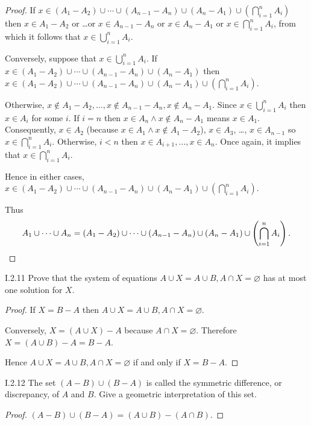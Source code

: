 \begin{proof}
	If \( x \in (A_{1} - A_{2}) \cup \cdots \cup (A_{n-1} - A_{n}) \cup (A_{n} - A_{1}) \cup \left( \bigcap^{n}_{i=1}A_{i} \right) \) then \( x \in A_{1} - A_{2} \) or \ldots or \( x \in A_{n-1} - A_{n} \) or \( x \in A_{n} - A_{1} \) or \( x \in \bigcap^{n}_{i=1}A_{i} \), from which it follows that \( x \in \bigcup^{n}_{i=1} A_{i} \).

	Conversely, suppose that \( x \in \bigcup^{n}_{i=1}A_{i} \). If \( x \in (A_{1} - A_{2}) \cup \cdots \cup (A_{n-1} - A_{n}) \cup (A_{n} - A_{1}) \) then \( x \in (A_{1} - A_{2}) \cup \cdots \cup (A_{n-1} - A_{n}) \cup (A_{n} - A_{1}) \cup \left( \bigcap^{n}_{i=1}A_{i} \right) \).

	Otherwise, \( x \notin A_{1} - A_{2}, \ldots, x\notin A_{n-1} - A_{n}, x \notin A_{n} - A_{1} \). Since \( x \in \bigcup^{n}_{i=1}A_{i} \) then \( x \in A_{i} \) for some \( i \). If \( i = n \) then \( x \in A_{n} \land x \notin A_{n} - A_{1} \) means \( x \in A_{1} \). Consequently, \( x \in A_{2} \) (because \( x \in A_{1} \land x \notin A_{1} - A_{2} \)), \( x \in A_{3} \), \ldots, \( x \in A_{n-1} \) so \( x \in \bigcap^{n}_{i=1}A_{i} \). Otherwise, \( i < n \) then \( x\in A_{i+1}, \ldots, x\in A_{n} \). Once again, it implies that \( x \in \bigcap^{n}_{i=1} A_{i} \).

	Hence in either cases, \( x \in (A_{1} - A_{2}) \cup \cdots \cup (A_{n-1} - A_{n}) \cup (A_{n} - A_{1}) \cup \left( \bigcap^{n}_{i=1}A_{i} \right) \).

	Thus
	\[
		A_{1} \cup \cdots \cup A_{n} = (A_{1} - A_{2}) \cup \cdots \cup (A_{n-1} - A_{n}) \cup (A_{n} - A_{1}) \cup \left( \bigcap^{n}_{i=1}A_{i} \right).\qedhere
	\]
\end{proof}

\begin{problem}{I.2.11}
Prove that the system of equations \( A\cup X = A\cup B, A \cap X = \varnothing \) has at most one solution for \(X\).
\end{problem}

\begin{proof}
	If \( X = B - A \) then \( A\cup X = A\cup B, A \cap X = \varnothing \).

	Conversely, \( X = (A \cup X) - A \) because \( A\cap X = \varnothing \). Therefore \( X = (A \cup B) - A = B - A \).

	Hence \( A\cup X = A\cup B, A \cap X = \varnothing \) if and only if \( X = B - A \).
\end{proof}

\begin{problem}{I.2.12}
The set \( (A - B) \cup (B - A) \) is called the symmetric difference, or discrepancy, of \( A \) and \( B \). Give a geometric interpretation of this set.
\end{problem}

\begin{proof}
	\( (A - B) \cup (B - A) = (A \cup B) - (A \cap B) \).
\end{proof}
